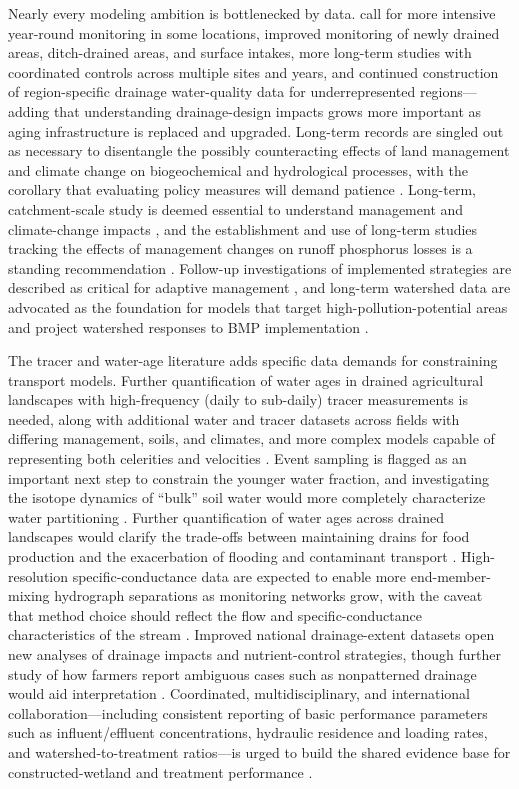 \documentclass[11pt]{article}
\begin{document}
Nearly every modeling ambition is bottlenecked by data. \textcite{Christianson2015} call for more intensive year-round monitoring in some locations, improved monitoring of newly drained areas, ditch-drained areas, and surface intakes, more long-term studies with coordinated controls across multiple sites and years, and continued construction of region-specific drainage water-quality data for underrepresented regions---adding that understanding drainage-design impacts grows more important as aging infrastructure is replaced and upgraded. Long-term records are singled out as necessary to disentangle the possibly counteracting effects of land management and climate change on biogeochemical and hydrological processes, with the corollary that evaluating policy measures will demand patience \parencite{Bauwe2020}. Long-term, catchment-scale study is deemed essential to understand management and climate-change impacts \parencite{Kelley2017}, and the establishment and use of long-term studies tracking the effects of management changes on runoff phosphorus losses is a standing recommendation \parencite{Gillingham2000}. Follow-up investigations of implemented strategies are described as critical for adaptive management \parencite{Schilling2012b}, and long-term watershed data are advocated as the foundation for models that target high-pollution-potential areas and project watershed responses to BMP implementation \parencite{Lemke2011}.

The tracer and water-age literature adds specific data demands for constraining transport models. Further quantification of water ages in drained agricultural landscapes with high-frequency (daily to sub-daily) tracer measurements is needed, along with additional water and tracer datasets across fields with differing management, soils, and climates, and more complex models capable of representing both celerities and velocities \parencite{Williams2021}. Event sampling is flagged as an important next step to constrain the younger water fraction, and investigating the isotope dynamics of ``bulk'' soil water would more completely characterize water partitioning \parencite{DimitrovaPetrova2020}. Further quantification of water ages across drained landscapes would clarify the trade-offs between maintaining drains for food production and the exacerbation of flooding and contaminant transport \parencite{DimitrovaPetrova2020}. High-resolution specific-conductance data are expected to enable more end-member-mixing hydrograph separations as monitoring networks grow, with the caveat that method choice should reflect the flow and specific-conductance characteristics of the stream \parencite{Kronholm2015}. Improved national drainage-extent datasets open new analyses of drainage impacts and nutrient-control strategies, though further study of how farmers report ambiguous cases such as nonpatterned drainage would aid interpretation \parencite{Jame2022}. Coordinated, multidisciplinary, and international collaboration---including consistent reporting of basic performance parameters such as influent/effluent concentrations, hydraulic residence and loading rates, and watershed-to-treatment ratios---is urged to build the shared evidence base for constructed-wetland and treatment performance \parencite{Messer2021,Sims1998}.
\end{document}

